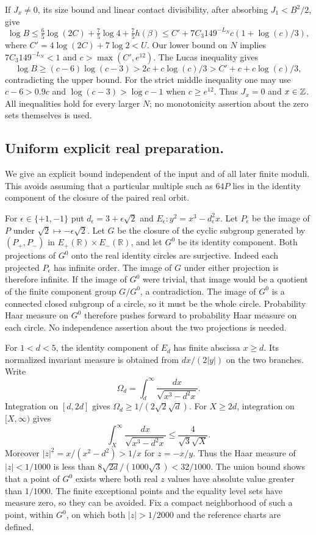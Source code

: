 If $J_x\ne0$, its size bound and linear contact divisibility, after
absorbing $J_1<B^2/2$, give
\[
 \log B\le\tfrac65\log(2C)+\tfrac75\log4+\tfrac75h(\beta)
 \le C'+7C_3 149^{-L_N}c(1+\log(c)/3),
\]
where $C'=4\log(2C)+7\log2<U$. Our lower bound on $N$ implies
$7C_3 149^{-L_N}<1$ and $c>\max(C',e^{12})$.
The Lucas inequality gives
\[
 \log B\ge(c-6)\log(c-3)>2c+c\log(c)/3
                         >C'+c+c\log(c)/3,
\]
contradicting the upper bound. For the strict middle inequality one may
use $c-6>0.9c$ and $\log(c-3)>\log c-1$ when $c\ge e^{12}$.
Thus $J_x=0$ and $x\in\mathbb Z$. All inequalities hold for every larger $N$;
no monotonicity assertion about the zero sets themselves is used.

\subsection{Uniform explicit real preparation.}\label{q198bb:real}
We give an explicit bound independent of the input and of all later
finite moduli.  This avoids assuming that a particular multiple such
as $64P$ lies in the identity component of the closure of the paired
real orbit.

For $\epsilon\in\{+1,-1\}$ put $d_\epsilon=3+\epsilon\sqrt2$ and
$E_\epsilon:y^2=x^3-d_\epsilon^2x$.
Let $P_\epsilon$ be the image of $P$ under
$\sqrt2\mapsto-\epsilon\sqrt2$.
Let $G$ be the closure of the cyclic subgroup generated by
$(P_+,P_-)$ in $E_+(\mathbb R)\times E_-(\mathbb R)$, and let
$G^0$ be its identity component.
Both projections of $G^0$ onto the real identity circles are surjective.
Indeed each projected $P_\epsilon$ has infinite order.  The image of
$G$ under either projection is therefore infinite.  If the image of
$G^0$ were trivial, that image would be a quotient of the finite
component group $G/G^0$, a contradiction.  The image of $G^0$ is a
connected closed subgroup of a circle, so it must be the whole circle.
Probability Haar measure on $G^0$ therefore pushes forward to
probability Haar measure on each circle.  No independence assertion
about the two projections is needed.

For $1<d<5$, the identity component of $E_d$ has finite abscissa
$x\ge d$.  Its normalized invariant measure is obtained from
$dx/(2|y|)$ on the two branches.  Write
\[
 \Omega_d=\int_d^\infty \frac{dx}{\sqrt{x^3-d^2x}}.
\]
Integration on $[d,2d]$ gives
$\Omega_d\ge1/(2\sqrt2\sqrt d)$.
For $X\ge2d$, integration on $[X,\infty)$ gives
\[
 \int_X^\infty \frac{dx}{\sqrt{x^3-d^2x}}
           \le \frac{4}{\sqrt3\sqrt X}.
\]
Moreover $|z|^2=x/(x^2-d^2)>1/x$ for $z=-x/y$.
Thus the Haar measure of $|z|<1/1000$ is less than
$8\sqrt{2d}/(1000\sqrt3)<32/1000$.
The union bound shows that a point of $G^0$ exists where both real
$z$ values have absolute value greater than $1/1000$.
The finite exceptional points and the equality level sets have measure
zero, so they can be avoided.  Fix a compact neighborhood of such a
point, within $G^0$, on which both $|z|>1/2000$ and the reference
charts are defined.

